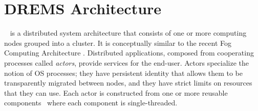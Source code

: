 \vspace{-0.09in}
\section{DREMS Architecture}
\label{sec:task_model}
\iap\ \cite{ISIS_F6_Aerospace:12,6899124,4813} is a distributed system architecture that consists
of one or more computing nodes grouped into a cluster. It is conceptually similar to the recent Fog Computing Architecture \cite{vaquero2014finding}. Distributed applications, composed from cooperating
processes called \textit{actors}, provide services for the end-user.
Actors specialize the notion of OS processes; 
they have persistent identity that allows them to be transparently
migrated between nodes, and they have strict limits on resources that
they can use.  Each actor is constructed from one or more reusable
components~\cite{ISIS_F6_ISORC:13,4813} where each component is
single-threaded.  


